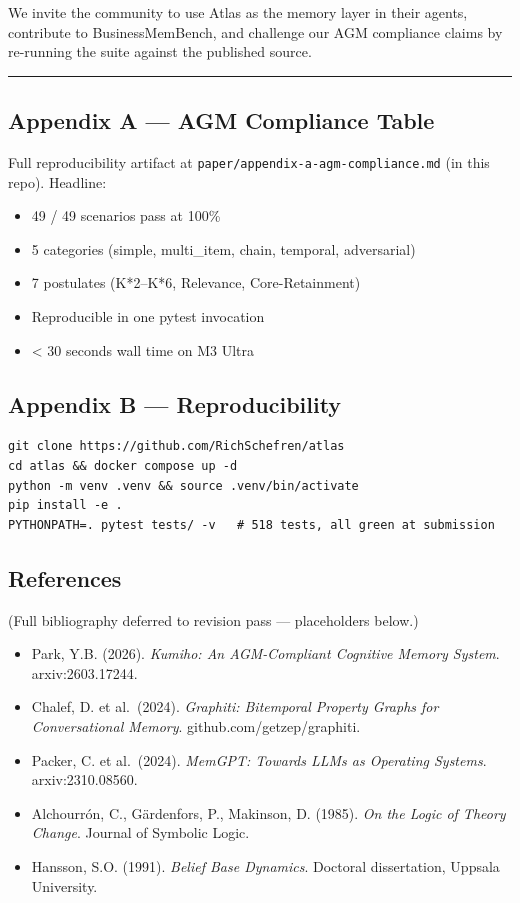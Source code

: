 \documentclass[
  11pt,
]{article}
\providecommand{\tightlist}{%
  \setlength{\itemsep}{0pt}\setlength{\parskip}{0pt}}
\begin{document}
We invite the community to use Atlas as the memory layer in their
agents, contribute to BusinessMemBench, and challenge our AGM compliance
claims by re-running the suite against the published source.

\begin{center}\rule{0.5\linewidth}{0.5pt}\end{center}

\subsection{Appendix A --- AGM Compliance
Table}\label{appendix-a-agm-compliance-table}

Full reproducibility artifact at
\texttt{paper/appendix-a-agm-compliance.md} (in this repo). Headline:

\begin{itemize}
\tightlist
\item
  49 / 49 scenarios pass at 100\%
\item
  5 categories (simple, multi\_item, chain, temporal, adversarial)
\item
  7 postulates (K*2--K*6, Relevance, Core-Retainment)
\item
  Reproducible in one pytest invocation
\item
  \textless{} 30 seconds wall time on M3 Ultra
\end{itemize}

\subsection{Appendix B ---
Reproducibility}\label{appendix-b-reproducibility}

\begin{verbatim}
git clone https://github.com/RichSchefren/atlas
cd atlas && docker compose up -d
python -m venv .venv && source .venv/bin/activate
pip install -e .
PYTHONPATH=. pytest tests/ -v   # 518 tests, all green at submission
\end{verbatim}

\subsection{References}\label{references}

(Full bibliography deferred to revision pass --- placeholders below.)

\begin{itemize}
\tightlist
\item
  Park, Y.B. (2026). \emph{Kumiho: An AGM-Compliant Cognitive Memory
  System}. arxiv:2603.17244.
\item
  Chalef, D. et al.~(2024). \emph{Graphiti: Bitemporal Property Graphs
  for Conversational Memory}. github.com/getzep/graphiti.
\item
  Packer, C. et al.~(2024). \emph{MemGPT: Towards LLMs as Operating
  Systems}. arxiv:2310.08560.
\item
  Alchourrón, C., Gärdenfors, P., Makinson, D. (1985). \emph{On the
  Logic of Theory Change}. Journal of Symbolic Logic.
\item
  Hansson, S.O. (1991). \emph{Belief Base Dynamics}. Doctoral
  dissertation, Uppsala University.
\end{itemize}
\end{document}
